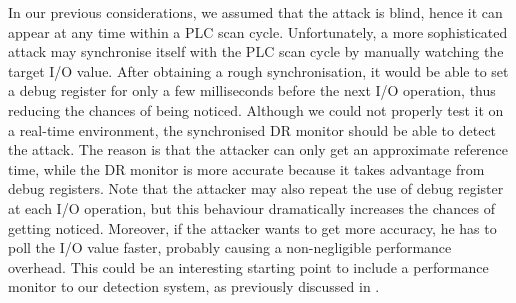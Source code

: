 In our previous considerations, we assumed that the attack is blind, hence it can appear at any time within a PLC scan cycle.
Unfortunately, a more sophisticated attack may synchronise itself with the PLC scan cycle by manually watching the target I/O value.
After obtaining a rough synchronisation, it would be able to set a debug register for only a few milliseconds before the next I/O operation,
thus reducing the chances of being noticed. Although we could not properly test it on a real-time environment, the synchronised DR monitor should be able to detect the attack.
The reason is that the attacker can only get an approximate reference time, while the DR monitor is more accurate because it takes advantage from debug registers.
Note that the attacker may also repeat the use of debug register at each I/O operation, but this behaviour dramatically increases the chances of getting noticed.
Moreover, if the attacker wants to get more accuracy, he has to poll the I/O value faster, probably causing a non-negligible performance overhead.
This could be an interesting starting point to include a performance monitor to our detection system, as previously discussed in . 
 
